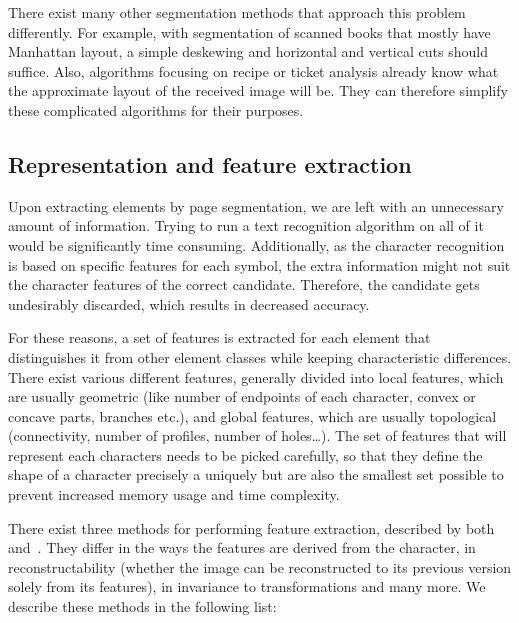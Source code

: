 There exist many other segmentation methods that approach this problem differently. For example, with segmentation of scanned books that mostly have Manhattan layout, a simple deskewing and horizontal and vertical cuts should suffice. Also, algorithms focusing on recipe or ticket analysis already know what the approximate layout of the received image will be. They can therefore simplify these complicated algorithms for their purposes.

\subsection{Representation and feature extraction}

Upon extracting elements by page segmentation, we are left with an unnecessary amount of information. Trying to run a text recognition algorithm on all of it would be significantly time consuming. Additionally, as the character recognition is based on specific features for each symbol, the extra information might not suit the character features of the correct candidate. Therefore, the candidate gets undesirably discarded, which results in decreased accuracy.

For these reasons, a set of features is extracted for each element that distinguishes it from other element classes while keeping characteristic differences. There exist various different features, generally divided into local features, which are usually geometric (like number of endpoints of each character, convex or concave parts, branches etc.), and global features, which are usually topological (connectivity, number of profiles, number of holes\ldots). The set of features that will represent each characters needs to be picked carefully, so that they define the shape of a character precisely a uniquely but are also the smallest set possible to prevent increased memory usage and time complexity.

There exist three methods for performing feature extraction, described by both~\citet{featureExtractionBook} and~\citet{featureExtractiontext}. They differ in the ways the features are derived from the character, in reconstructability (whether the image can be reconstructed to its previous version solely from its features), in invariance to transformations and many more. We describe these methods in the following list:

